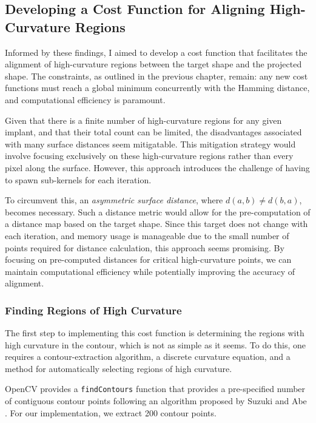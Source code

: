 \subsection{Developing a Cost Function for Aligning High-Curvature Regions}

Informed by these findings, I aimed to develop a cost function that facilitates the alignment of high-curvature regions between the target shape and the projected shape.
The constraints, as outlined in the previous chapter, remain: any new cost functions must reach a global minimum concurrently with the Hamming distance, and computational efficiency is paramount.


Given that there is a finite number of high-curvature regions for any given implant, and that their total count can be limited, the disadvantages associated with many surface distances seem mitigatable.
This mitigation strategy would involve focusing exclusively on these high-curvature regions rather than every pixel along the surface.
However, this approach introduces the challenge of having to spawn sub-kernels for each iteration.

To circumvent this, an \emph{asymmetric surface distance}, where $d(a,b) \ne d(b,a)$, becomes necessary.
Such a distance metric would allow for the pre-computation of a distance map based on the target shape.
Since this target does not change with each iteration, and memory usage is manageable due to the small number of points required for distance calculation, this approach seems promising.
By focusing on pre-computed distances for critical high-curvature points, we can maintain computational efficiency while potentially improving the accuracy of alignment.

\subsubsection{Finding Regions of High Curvature}
The first step to implementing this cost function is determining the regions with high curvature in the contour, which is not as simple as it seems.
To do this, one requires a contour-extraction algorithm, a discrete curvature equation, and a method for automatically selecting regions of high curvature.

OpenCV provides a \texttt{findContours} function \cite{bradskiOpenCVLibrary2000} that provides a pre-specified number of contiguous contour points following an algorithm proposed by Suzuki and Abe \cite{suzukiTopologicalStructuralAnalysis1985}.
For our implementation, we extract 200 contour points.


